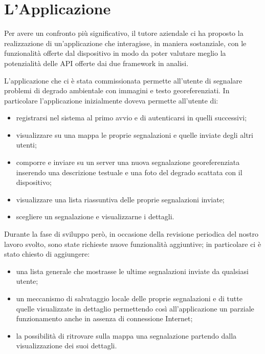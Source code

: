 \chapter{L'Applicazione}
	Per avere un confronto più significativo, il tutore aziendale ci ha proposto
	la realizzazione di un'applicazione che interagisse, in maniera sostanziale,
	con le funzionalità offerte dal dispositivo in modo da poter valutare meglio
	la potenzialità delle API offerte dai due frame\-work in analisi.
	
	L'applicazione che ci è stata commissionata permette all'utente di segnalare 
	problemi di degrado ambientale con immagini e testo georeferenziati.
	In particolare l'applicazione inizialmente doveva permette all'utente di:
	\begin{itemize}
		\item registrarsi nel sistema al primo avvio e di autenticarsi in quelli
		      successivi;
		\item visualizzare su una mappa le proprie segnalazioni e quelle inviate
		      degli altri utenti;
		\item comporre e inviare su un server una nuova segnalazione
		      georeferenziata inserendo una descrizione testuale e una foto del
		      degrado scattata con il dispositivo;
		\item visualizzare una lista riassuntiva delle proprie segnalazioni
		      inviate;
		\item scegliere un segnalazione e visualizzarne i dettagli.
	\end{itemize}
	Durante la fase di sviluppo però, in occasione della revisione periodica del
	nostro lavoro svolto, sono state richieste nuove funzionalità aggiuntive; in
	particolare ci è stato chiesto di aggiungere:
	\begin{itemize}
		\item una lista generale che mostrasse le ultime segnalazioni inviate da
		      qualsiasi utente;
		\item un meccanismo di salvataggio locale delle proprie segnalazioni e
		      di tutte quelle visualizzate in dettaglio permettendo così
		      all'applicazione un parziale funzionamento anche in assenza di
		      connessione Internet;
		\item la possibilità di ritrovare sulla mappa una segnalazione partendo
		      dalla visualizzazione dei suoi dettagli.
	\end{itemize}
	
